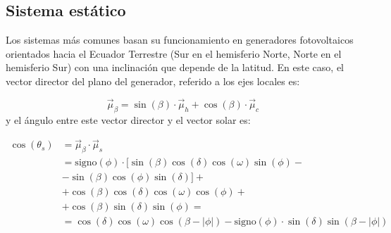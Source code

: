 \subsection{Sistema estático}

Los sistemas más comunes basan su funcionamiento en generadores
fotovoltaicos orientados hacia el Ecuador Terrestre (Sur en el
hemisferio Norte, Norte en el hemisferio Sur) con una inclinación que
depende de la latitud. En este caso, el vector director del plano del
generador, referido a los ejes locales es:

\begin{equation}
\vec{\mu}_{\beta}=\sin(\beta)\cdot\vec{\mu}_{h}+\cos(\beta)\cdot\vec{\mu}_{c}\end{equation}
y
el ángulo entre este vector director y el vector solar es:

\begin{align}
\cos(\theta_{s}) & =\vec{\mu}_{\beta}\cdot\vec{\mu}_{s}\nonumber \\
 & =\mathrm{signo}(\phi)\cdot\bigl[\sin(\beta)\cos\left(\delta\right)\cos\left(\omega\right)\sin\left(\phi\right)-\nonumber \\
 & -\sin(\beta)\cos\left(\phi\right)\sin\left(\delta\right)\bigr]+\nonumber \\
 & +\cos(\beta)\cos\left(\delta\right)\cos\left(\omega\right)\cos\left(\phi\right)+\nonumber \\
 & +\cos(\beta)\sin\left(\delta\right)\sin\left(\phi\right)=\nonumber \\
 & =\cos\left(\delta\right)\cos\left(\omega\right)\cos\left(\beta-|\phi|\right)-\mathrm{signo}(\phi)\cdot\sin(\delta)\sin\left(\beta-|\phi|\right)\label{eq:cosThetaEstaticaSUR}\end{align}

